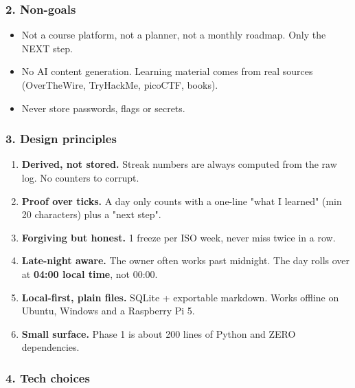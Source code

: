 \hypertarget{hackstreak-spec-2-non-goals}{%
\subsubsection{2. Non-goals}\label{hackstreak-spec-2-non-goals}}

\begin{itemize}
\tightlist
\item
  Not a course platform, not a planner, not a monthly roadmap. Only the
  NEXT step.
\item
  No AI content generation. Learning material comes from real sources
  (OverTheWire, TryHackMe, picoCTF, books).
\item
  Never store passwords, flags or secrets.
\end{itemize}

\hypertarget{hackstreak-spec-3-design-principles}{%
\subsubsection{3. Design principles}\label{hackstreak-spec-3-design-principles}}

\begin{enumerate}
\def\labelenumi{\arabic{enumi}.}
\tightlist
\item
  \textbf{Derived, not stored.} Streak numbers are always computed from
  the raw log. No counters to corrupt.
\item
  \textbf{Proof over ticks.} A day only counts with a one-line "what I
  learned" (min 20 characters) plus a "next step".
\item
  \textbf{Forgiving but honest.} 1 freeze per ISO week, never miss twice
  in a row.
\item
  \textbf{Late-night aware.} The owner often works past midnight. The
  day rolls over at \textbf{04:00 local time}, not 00:00.
\item
  \textbf{Local-first, plain files.} SQLite + exportable markdown. Works
  offline on Ubuntu, Windows and a Raspberry Pi 5.
\item
  \textbf{Small surface.} Phase 1 is about 200 lines of Python and ZERO
  dependencies.
\end{enumerate}

\hypertarget{hackstreak-spec-4-tech-choices}{%
\subsubsection{4. Tech choices}\label{hackstreak-spec-4-tech-choices}}

